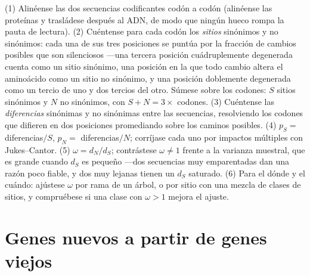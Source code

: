 \begin{method}[Estimar $d_{N}/d_{S}$]\label{met:b3:molecular-evolution:method}
(1) Alinéense las dos secuencias codificantes codón a codón (alinéense
las proteínas y trasládese después al ADN, de modo que ningún hueco
rompa la pauta de lectura). (2) Cuéntense para cada codón los
\emph{sitios} sinónimos y no sinónimos: cada una de sus tres posiciones
se puntúa por la fracción de cambios posibles que son silenciosos ---una
tercera posición cuádruplemente degenerada cuenta como un sitio
sinónimo, una posición en la que todo cambio altera el aminoácido como
un sitio no sinónimo, y una posición doblemente degenerada como un
tercio de uno y dos tercios del otro. Súmese sobre los codones: $S$
sitios sinónimos y $N$ no sinónimos, con $S + N = 3 \times$ codones. (3)
Cuéntense las \emph{diferencias} sinónimas y no sinónimas entre las
secuencias, resolviendo los codones que difieren en dos posiciones
promediando sobre los caminos posibles. (4) $p_{S} = $ diferencias$/S$,
$p_{N} = $ diferencias$/N$; corríjase cada uno por impactos múltiples
con Jukes--Cantor. (5) $\omega =
d_{N}/d_{S}$; contrástese $\omega \ne 1$ frente a la varianza muestral,
que es grande cuando $d_{S}$ es pequeño ---dos secuencias muy
emparentadas dan una razón poco fiable, y dos muy lejanas tienen un
$d_{S}$ saturado. (6) Para el dónde y el cuándo: ajústese $\omega$ por
rama de un árbol, o por sitio con una mezcla de clases de sitios, y
compruébese si una clase con $\omega > 1$ mejora el ajuste.
\end{method}

\section{Genes nuevos a partir de genes viejos}

